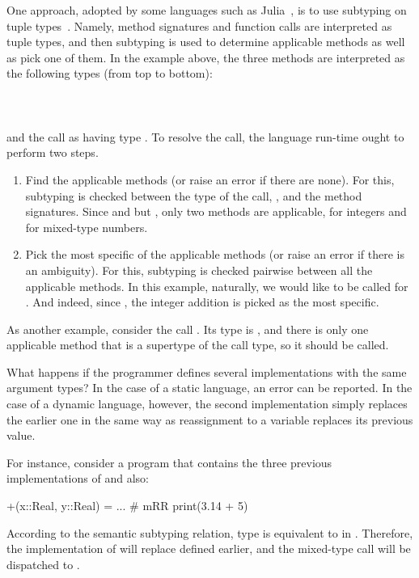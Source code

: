 One approach, adopted by some languages
such as Julia~\cite{Bezanson2015AbstractionIT}, 
is to use subtyping on tuple types~\cite{bib:Leavens:1998:mddtuples}.
Namely, method signatures and function calls are interpreted as tuple types,
and then subtyping is used to determine applicable methods 
as well as pick one of them.
In the example above, the three methods are interpreted 
as the following types (from top to bottom):\\
\\
\\
\\
and the call as having type .
To resolve the call, the language run-time ought to perform two steps.
\begin{enumerate}
  \item Find the applicable methods (or raise an error if there are none). 
    For this, subtyping is checked between
    the type of the call, , and the method signatures.
    Since  and  but
    , only two methods are applicable,
     for integers and  for mixed-type numbers.
  \item Pick the most specific of the applicable methods
    (or raise an error if there is an ambiguity).
    For this, subtyping is checked pairwise between all the applicable methods.
    In this example, naturally, we would like  to be called
    for . And indeed, since ,
    the integer addition is picked as the most specific.
\end{enumerate}
As another example, consider the call . Its type is
, and there is only one applicable method 
that is a supertype of the call type, so it should be called.

What happens if the programmer defines
several implementations with the same argument types? 
In the case of a static language, an error can be reported.
In the case of a dynamic language, however, the second implementation
simply replaces the earlier one in the same way as reassignment
to a variable replaces its previous value.

For instance, consider a program 
that contains the three previous implementations of \jlcode{(+)} %
and also: %
\begin{lstminijl}
+(x::Real, y::Real) = ...   # mRR
print(3.14 + 5)	 
\end{lstminijl}
According to the semantic subtyping relation, type  is equivalent
to  in \BetaJulia. 
Therefore, the implementation of  will replace 
 defined earlier, 
and the mixed-type call  will be dispatched to .

